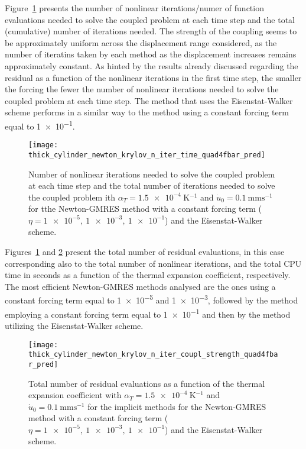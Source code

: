 Figure~\ref{fig:thick_cylinder_newton_krylov_n_iter_time_quad4fbar_pred} presents the number of nonlinear iterations/numer of function evaluations needed to solve the coupled problem at each time step and the total (cumulative) number of iterations needed.
The strength of the coupling seems to be approximately uniform across the displacement range considered, as the number of iteratins taken by each method as the displacement increases remains approximately constant.
As hinted by the results already discussed regarding the residual as a function of the nonlinear iterations in the first time step, the smaller the forcing the fewer the number of nonlinear iterations needed to solve the coupled problem at each time step.
The method that uses the Eisenstat-Walker scheme performs in a similar way to the method using a constant forcing term equal to \num{1e-1}.

\begin{figure}
  \texttt{[image: thick\_cylinder\_newton\_krylov\_n\_iter\_time\_quad4fbar\_pred]}
  \caption{Number of nonlinear iterations needed to solve the coupled problem at each time step and the total number of iterations needed to solve the coupled problem ith \(\alpha_T=\SI{1.5e-4}{\kelvin^{-1}}\) and \(\dot u_0 =\SI{0.1}{\milli\meter\second^{-1}}\) for tthe Newton-GMRES method with a constant forcing term (\(\eta=\num{1e-5},\ \num{1e-3},\ \num{1e-1}\)) and the Eisenstat-Walker scheme.}
\label{fig:thick_cylinder_newton_krylov_n_iter_time_quad4fbar_pred}
\end{figure}

Figures~\ref{fig:thick_cylinder_newton_krylov_n_iter_time_quad4fbar_pred} and \ref{fig:thick_cylinder_newton_krylov_n_iter_coupl_strength_quad4fbar_pred} present the total number of residual evaluations, in this case corresponding also to the total number of nonlinear iterations, and the total CPU time in seconds as a function of the thermal expansion coefficient, respectively.
The most efficient Newton-GMRES methods analysed are the ones using a constant forcing term equal to \num{1e-5} and \num{1e-3}, followed by the method employing a constant forcing term equal to \num{1e-1} and then by the method utilizing the Eisenstat-Walker scheme.

\begin{figure}
  \texttt{[image: thick\_cylinder\_newton\_krylov\_n\_iter\_coupl\_strength\_quad4fbar\_pred]}
  \caption{Total number of residual evaluations as a function of the thermal expansion coefficient with \(\alpha_T=\SI{1.5e-4}{\kelvin^{-1}}\) and \(\dot u_0 =\SI{0.1}{\milli\meter\second^{-1}}\) for the implicit methods for the Newton-GMRES method with a constant forcing term (\(\eta=\num{1e-5},\ \num{1e-3},\ \num{1e-1}\)) and the Eisenstat-Walker scheme.}
\label{fig:thick_cylinder_newton_krylov_n_iter_coupl_strength_quad4fbar_pred}
\end{figure}

